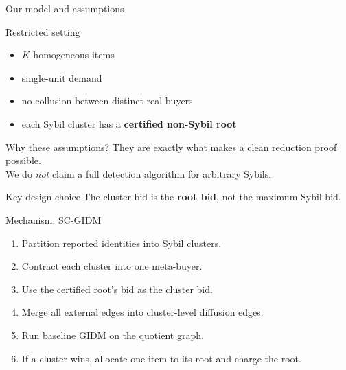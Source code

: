\documentclass[aspectratio=169]{beamer}
\begin{document}
\begin{frame}{Our model and assumptions}
\begin{block}{Restricted setting}
\begin{itemize}
    \item \(K\) homogeneous items
    \item single-unit demand
    \item no collusion between distinct real buyers
    \item each Sybil cluster has a \textbf{certified non-Sybil root}
\end{itemize}
\end{block}

\begin{block}{Why these assumptions?}
They are exactly what makes a clean reduction proof possible.\\
We do \emph{not} claim a full detection algorithm for arbitrary Sybils.
\end{block}

\begin{alertblock}{Key design choice}
The cluster bid is the \textbf{root bid}, not the maximum Sybil bid.
\end{alertblock}
\end{frame}

\begin{frame}{Mechanism: SC-GIDM}
\begin{enumerate}
    \item Partition reported identities into Sybil clusters.
    \item Contract each cluster into one meta-buyer.
    \item Use the certified root's bid as the cluster bid.
    \item Merge all external edges into cluster-level diffusion edges.
    \item Run baseline GIDM on the quotient graph.
    \item If a cluster wins, allocate one item to its root and charge the root.
\end{enumerate}

\vspace{0.6em}
\centering
{}
\end{frame}
\end{document}
